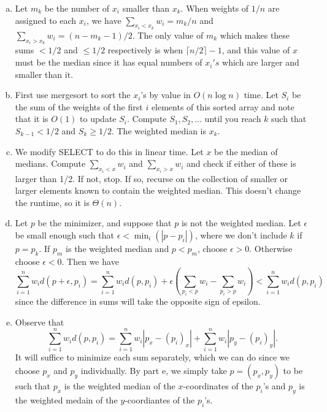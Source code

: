 \documentclass{article}
\begin{document}
\begin{enumerate}[a.]
\item Let $m_k$ be the number of $x_i$ smaller than $x_k$.  When weights of $1/n$ are assigned to each $x_i$, we have $\sum_{x_i < x_k} w_i = m_k/n$ and $\sum_{x_i > x_k} w_i = (n-m_k-1)/2$.  The only value of $m_k$ which makes these sums $<1/2$ and $\leq 1/2$ respectively is when $\lceil n/2 \rceil - 1$, and this value of $x$ must be the median since it has equal numbers of $x_i's$ which are larger and smaller than it. \\

\item First use mergesort to sort the $x_i$'s by value in $O(n \log n)$ time.  Let $S_i$ be the sum of the weights of the first $i$ elements of this sorted array and note that it is $O(1)$ to update $S_i$.  Compute $S_1, S_2, \ldots$ until you reach $k$ such that $S_{k-1}<1/2$ and $S_k \geq 1/2$.  The weighted median is $x_k$. \\

\item We modify SELECT to do this in linear time.  Let $x$ be the median of medians.  Compute $\sum_{x_i < x}w_i$ and $\sum_{x_i > x}w_i$ and check if either of these is larger than 1/2.  If not, stop.  If so, recurse on the collection of smaller or larger elements known to contain the weighted median. This doesn't change the runtime, so it is $\Theta(n)$. \\

\item Let $p$ be the minimizer, and suppose that $p$ is not the weighted median.  Let $\epsilon$ be small enough such that $\epsilon < \min_{i}(|p-p_i|)$, where we don't include $k$ if $p = p_k$.  If $p_m$ is the weighted median and $p < p_m$, choose $\epsilon > 0$.  Otherwise choose $\epsilon < 0$.  Then we have
\[ \sum_{i=1}^n w_i d(p+\epsilon, p_i) = \sum_{i=1}^n w_i d(p,p_i) + \epsilon \left( \sum_{p_i < p} w_i - \sum_{p_i > p} w_i \right) < \sum_{i=1}^n w_i d(p, p_i) \]
since the difference in sums will take the opposite sign of epsilon. \\

\item Observe that 
\[ \sum_{i=1}^n w_i d(p, p_i) = \sum_{i=1}^n w_i|p_x - (p_i)_x| + \sum_{i=1}^n w_i|p_y - (p_i)_y|.\]
It will suffice to minimize each sum separately, which we can do since we choose $p_x$ and $p_y$ individually.  By part e, we simply take $p = (p_x, p_y)$ to be such that $p_x$ is the weighted median of the $x$-coordinates of the $p_i$'s and $p_y$ is the weighted medain of the $y$-coordiantes of the $p_i$'s.\\

\end{enumerate}
\end{document}
